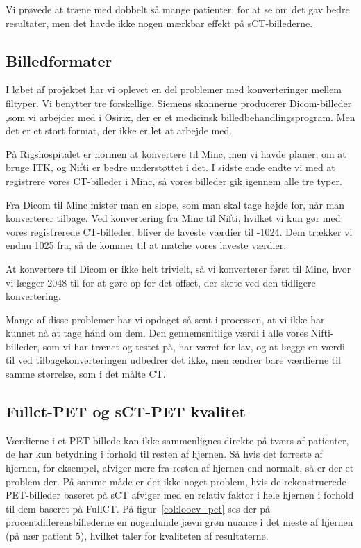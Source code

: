 Vi prøvede at træne med dobbelt så mange patienter, for at se om det gav bedre resultater, men det havde ikke nogen mærkbar effekt på sCT-billederne.


\subsection{Billedformater}

I løbet af projektet har vi oplevet en del problemer med konverteringer
mellem filtyper. Vi benytter tre forskellige. Siemens skannerne producerer
Dicom-billeder ,som vi arbejder med i Osirix, der er et medicinsk
billedbehandlingsprogram. Men det er et stort format, der ikke er
let at arbejde med. 

På Rigshospitalet er normen at konvertere til Minc, men vi havde planer,
om at bruge ITK, og Nifti er bedre understøttet i det. I sidste ende
endte vi med at registrere vores CT-billeder i Minc, så vores billeder gik
igennem alle tre typer. 

Fra Dicom til Minc mister man en slope, som man skal tage højde for, når
man konverterer tilbage. Ved konvertering fra Minc til Nifti, hvilket vi
kun gør med vores registrerede CT-billeder, bliver de laveste værdier til
-1024. Dem trækker vi endnu 1025 fra, så de kommer til at matche vores
laveste værdier.

At konvertere til Dicom er ikke helt trivielt, så vi konverterer først til
Minc, hvor vi lægger 2048 til for at gøre op for det offset, der skete ved
den tidligere konvertering. 

Mange af disse problemer har vi opdaget så sent i processen, at vi ikke
har kunnet nå at tage hånd om dem. Den gennemsnitlige værdi i alle vores
Nifti-billeder, som vi har trænet og testet på, har været for lav, og at
lægge en værdi til ved tilbagekonverteringen udbedrer det ikke, men ændrer
bare værdierne til samme størrelse, som i det målte CT.

\subsection{Fullct-PET og sCT-PET kvalitet}

Værdierne i et PET-billede kan ikke sammenlignes direkte på tværs af patienter, de har kun betydning i forhold til resten af hjernen. Så hvis det forreste af hjernen, for eksempel, afviger mere fra resten af hjernen end normalt, så er der et problem der. På samme måde er det ikke noget problem, hvis de rekonstruerede PET-billeder baseret på sCT afviger med en relativ faktor i hele hjernen i forhold til dem baseret på FullCT. På figur~\ref{col:loocv_pet} ses der på procentdifferensbillederne en nogenlunde jævn grøn nuance i det meste af hjernen (på nær patient 5), hvilket taler for kvaliteten af resultaterne. 


